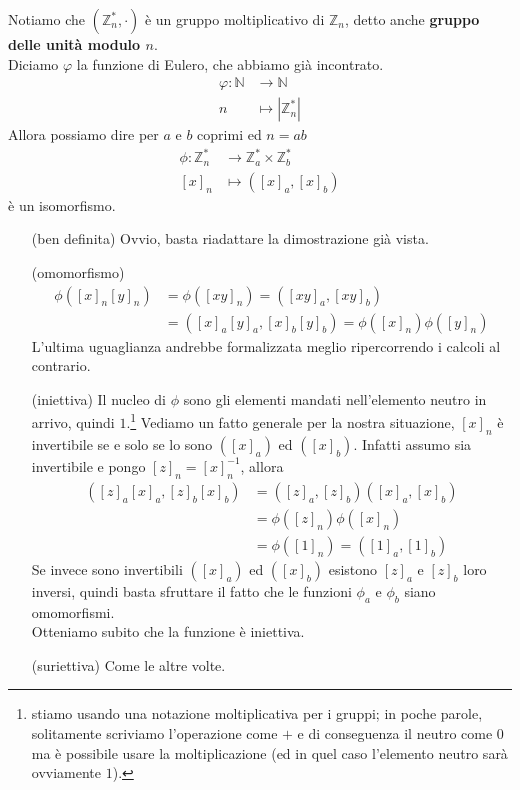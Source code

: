 \begin{osservazione}
	Notiamo che $\left(\mathbb{Z}_n^*,\cdot\right)$ è un gruppo moltiplicativo di $\mathbb{Z}_n$, detto anche \textbf{gruppo delle unità modulo $n$}. \\ Diciamo $\varphi$ la funzione di Eulero, che abbiamo già incontrato.
	\begin{align*}
	\varphi: \mathbb{N}&\longrightarrow \mathbb{N}\\
	n &\longmapsto |\mathbb{Z}_n^*|
	\end{align*}
	Allora possiamo dire per $a$ e $b$ coprimi ed $n=ab$
	\begin{align*}
	\phi:\mathbb{Z}^*_n&\longrightarrow\mathbb{Z}^*_a\times \mathbb{Z}^*_b\\
	[x]_n&\longmapsto\left([x]_a,[x]_b\right)
	\end{align*}
	è un isomorfismo.
	\begin{itemize}
		\item[(ben definita)] Ovvio, basta riadattare la dimostrazione già vista.
		\item[(omomorfismo)] 
		\begin{align*}
		\phi\left([x]_n[y]_n\right)&=\phi\left([xy]_n\right)=\left([xy]_a,[xy]_b\right)\\
		&=\left([x]_a[y]_a,[x]_b[y]_b\right)=\phi\left([x]_n\right)\phi\left([y]_n\right)
		\end{align*}
		L'ultima uguaglianza andrebbe formalizzata meglio ripercorrendo i calcoli al contrario. \\
		\item[(iniettiva)] Il nucleo di $\phi$ sono gli elementi mandati nell'elemento neutro in arrivo, quindi $1$.\footnote{stiamo usando una notazione moltiplicativa per i gruppi; in poche parole, solitamente scriviamo l'operazione come $+$ e di conseguenza il neutro come $0$ ma è possibile usare la moltiplicazione (ed in quel caso l'elemento neutro sarà ovviamente $1$).}
		Vediamo un fatto generale per la nostra situazione, $[x]_n$ è invertibile se e solo se lo sono $\left([x]_a\right)$ ed $\left([x]_b\right)$. Infatti assumo sia invertibile e pongo $[z]_n=[x]^{-1}_n$, allora
		\begin{align*}
		\left([z]_a[x]_a,[z]_b[x]_b\right)&=\left([z]_a,[z]_b\right)\left([x]_a,[x]_b\right)\\
		&=\phi([z]_n)\phi([x]_n)\\
		&=\phi([1]_n)=\left([1]_a,[1]_b\right)
		\end{align*}
		Se invece sono invertibili $\left([x]_a\right)$ ed $\left([x]_b\right)$ esistono $[z]_a$ e $[z]_b$ loro inversi, quindi basta sfruttare il fatto che le funzioni $\phi_a$ e $\phi_b$ siano omomorfismi. \\ Otteniamo subito che la funzione è iniettiva.
		\item[(suriettiva)] Come le altre volte.
	\end{itemize}
\end{osservazione}

